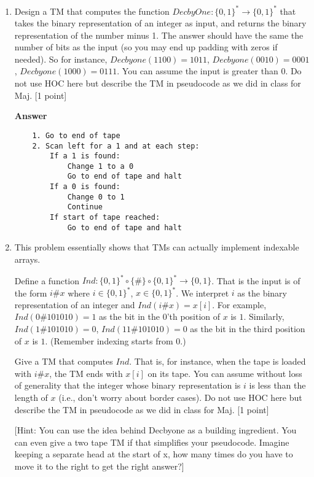 \documentclass[11pt]{article}
\newcommand \kw[1]{\textbf{#1}}
\newenvironment{answer}{
\vspace{.5cm}
\begin{mdframed}[]
    \kw{Answer} 
}
{
\end{mdframed}
\pagebreak
}
\begin{document}
\begin{enumerate}
\item Design a TM that computes the function $DecbyOne:\{0,1\}^* \rightarrow \{0,1\}^*$ that takes the binary representation of an integer as input, and returns the binary representation of the number minus 1. The answer should have the same the number of bits as the input (so you may end up padding with zeros if needed). So for instance, $Decbyone(1100) = 1011$, $Decbyone(0010) = 0001$, $Decbyone(1000) = 0111$. You can assume the input is greater than $0$. Do not use HOC here but describe the TM in pseudocode as we did in class for Maj. [1 point]

\begin{answer}
    
    \begin{verbatim}
    1. Go to end of tape
    2. Scan left for a 1 and at each step:
        If a 1 is found:
            Change 1 to a 0
            Go to end of tape and halt
        If a 0 is found:
            Change 0 to 1
            Continue
        If start of tape reached:
            Go to end of tape and halt
    \end{verbatim}
\end{answer}

\item This problem essentially shows that TMs can actually implement indexable arrays. 

Define a function $Ind:\{0,1\}^*\circ \{\#\}\circ \{0,1\}^* \rightarrow \{0,1\}$. That is the input is of the form $i\#x$ where $i \in \{0,1\}^*$, $x \in \{0,1\}^*$. We interpret $i$ as the binary representation of an integer and $Ind(i\#x) = x[i]$. For example, $Ind(0\#101010) = 1$ as the bit in the $0$'th position of $x$ is $1$. Similarly, $Ind(1\#101010) = 0$, $Ind(11\#101010) = 0$ as the bit in the third position of $x$ is $1$. (Remember indexing starts from $0$.)

Give a TM that computes $Ind$. That is, for instance, when the tape is loaded with $i\#x$, the TM ends with $x[i]$ on its tape. You can assume without loss of generality that the integer whose binary representation is $i$ is less than the length of $x$ (i.e., don't worry about border cases). Do not use HOC here but describe the TM in pseudocode as we did in class for Maj. [1 point]

[Hint: You can use the idea behind Decbyone as a building ingredient. You can even give a two tape TM if that simplifies your pseudocode. Imagine keeping a separate head at the start of x, how many times do you have to move it to the right to get the right answer?]


\end{enumerate}
\end{document}
